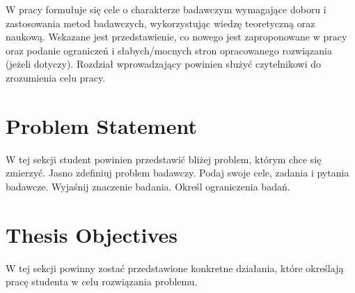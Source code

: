 \label{chapter:introduction}
W pracy formułuje się cele o charakterze badawczym wymagające doboru
i zastosowania metod badawczych, wykorzystując wiedzę teoretyczną
oraz naukową. Wskazane jest przedstawienie, co nowego jest
zaproponowane w pracy oraz podanie ograniczeń i słabych/mocnych stron
opracowanego rozwiązania (jeżeli dotyczy). Rozdział wprowadzający
powinien służyć czytelnikowi do zrozumienia celu pracy.

\section{Problem Statement}
W tej sekcji student powinien przedstawić bliżej problem, którym chce
się zmierzyć. Jasno zdefiniuj problem badawczy. Podaj swoje cele,
zadania i pytania badawcze. Wyjaśnij znaczenie badania. Określ
ograniczenia badań.

\section{Thesis Objectives}
W tej sekcji powinny zostać przedstawione konkretne działania, które
określają pracę studenta w celu rozwiązania problemu.
